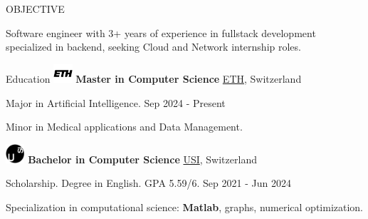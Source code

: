 \documentclass{cv} %
\def\intraexpvspace{0.15cm}
\begin{document}
\begin{minipage}[b][0.9\paperheight][t]{0.7\linewidth}

    \headline

    \begin{rSection}{OBJECTIVE}
        \item Software engineer with 3+ years of experience in fullstack development specialized in backend,
        seeking Cloud and Network internship roles.
    \end{rSection}

    \begin{rSection}{Education}
        \vspace{0.2cm}
        \includegraphics[width=0.7cm, trim={0cm 3cm 0cm 0cm}]{ethz-icon.png}
        {\bf Master in Computer Science}
        \hfill \href{https://ethz.ch/en.html}{ETH}, Switzerland
        \item \hspace{0.85cm}Major in Artificial Intelligence. %
        \hfill {Sep 2024 - Present}
        \item Minor in Medical applications and Data Management.
        \vspace{\intraexpvspace}
        \vspace{\intraexpvspace}

        \includegraphics[width=0.7cm, trim={0cm 10cm 0cm 0cm}]{usi-icon.png}
        {\bf Bachelor in Computer Science}
        \hfill \href{https://www.usi.ch/en}{USI}, Switzerland
        \item \hspace{0.85cm}Scholarship. Degree in English. GPA 5.59/6.
        \hfill {Sep 2021 - Jun 2024}
        \item Specialization in computational science: \textbf{Matlab}, graphs, numerical optimization.
        \vspace{\intraexpvspace}
        \vspace{\intraexpvspace}


\end{rSection}
\end{minipage}
\end{document}
